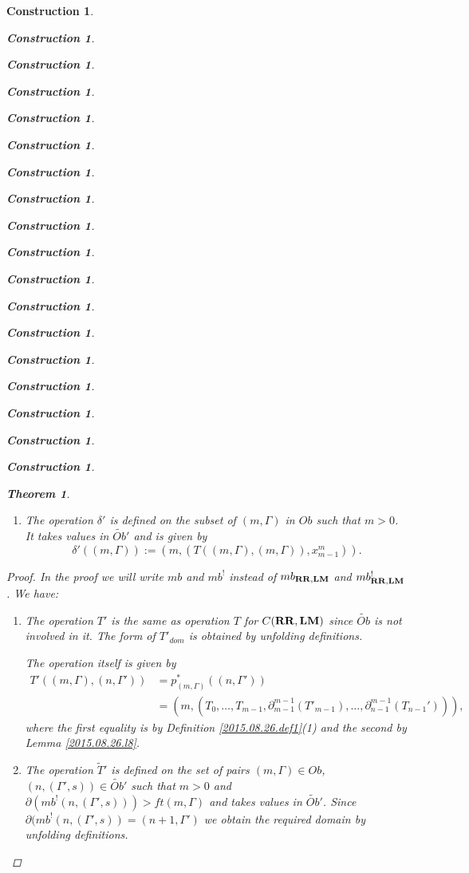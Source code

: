 \documentclass[onecolumn,12pt]{amsart}
\newtheorem{theorem}[proposition]{Theorem}
\numberwithin{proposition}{subsection}
\newtheorem{construction}[proposition]{Construction}
\newcommand{\wt}{\widetilde}
\newcommand{\RR}{{\bf RR}}
\newcommand{\LM}{{\bf LM}}
\begin{document}
\begin{construction}
\begin{construction}
\begin{construction}
\begin{construction}
\begin{construction}
\begin{construction}
\begin{construction}
\begin{construction}
\begin{construction}
\begin{construction}
\begin{construction}
\begin{construction}
\begin{construction}
\begin{construction}
\begin{construction}
\begin{construction}
\begin{construction}
\begin{construction}
\begin{theorem}
\begin{enumerate}
\[\wt{S}'((m,(\Gamma,r)),(n,(\Gamma',s))):=(n-1,(S'((m,(\Gamma,r)),(n+1,\Gamma'))),\theta_{m,n}(r,s)).\]
%
\item The operation $\delta'$ is defined on the subset of $(m,\Gamma)$ in $Ob$ such
  that $m>0$. It takes values in $\wt{Ob}'$ and is given by
%
\[\delta'((m,\Gamma)):=(m,(T((m,\Gamma),(m,\Gamma)),x_{m-1}^m)).\]
%
\end{enumerate}
\end{theorem}
%
\begin{proof}
In the proof we will write $mb$ and $mb^!$ instead of $mb_{\RR,\LM}$ and
$mb^!_{\RR,\LM}$. We have:
%
\begin{enumerate}
%
\item The operation $T'$ is the same as operation $T$ for $C(\RR,\LM)$ since
  $\wt{Ob}$ is not involved in it. The form of $T'_{dom}$ is obtained by
  unfolding definitions.

The operation itself is given by 
\begin{equation*}
  \begin{split}
    T'((m,\Gamma),(n,\Gamma'))&=p_{(m,\Gamma)}^*((n,\Gamma'))\\
    &=(m,(T_0,\dots,T_{m-1},\partial_{m-1}^{m-1}(T'_{m-1}),\dots, \partial_{n-1}^{m-1}(T_{n-1}'))),
  \end{split}
\end{equation*}
where the first equality is by Definition \ref{2015.08.26.def1}(1) and the second by Lemma \ref{2015.08.26.l8}. 
%
\item The operation $\wt{T}'$ is defined on the set of pairs $(m,\Gamma)\in Ob$,
  $(n,(\Gamma',s))\in \wt{Ob}'$ such that $m>0$ and
  $\partial(mb^!(n,(\Gamma',s)))>ft(m,\Gamma)$ and takes values in
  $\wt{Ob}'$. Since $\partial(mb^!(n,(\Gamma',s))=(n+1,\Gamma')$ we obtain the
  required domain by unfolding definitions.


\end{enumerate}
\end{proof}
\end{construction}
\end{construction}
\end{construction}
\end{construction}
\end{construction}
\end{construction}
\end{construction}
\end{construction}
\end{construction}
\end{construction}
\end{construction}
\end{construction}
\end{construction}
\end{construction}
\end{construction}
\end{construction}
\end{construction}
\end{construction}
\end{document}
